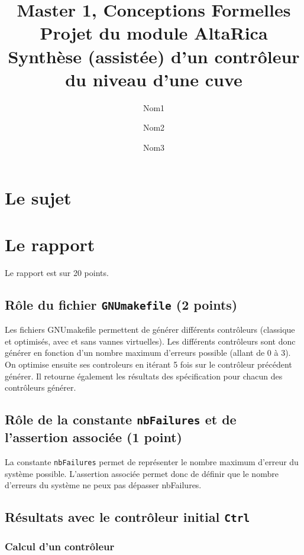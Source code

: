 \documentclass[a4paper]{book}
\newcommand{\altarica}{{\sc AltaRica}}
\begin{document}
\title{Master 1, Conceptions Formelles\\
Projet du module \altarica\\
Synthèse (assistée) d'un contrôleur du niveau d'une cuve}

\date{}

\author{Nom1 \and Nom2 \and Nom3}

\maketitle

\chapter{Le sujet}


\chapter{Le rapport}
Le rapport est sur 20 points.

\section{Rôle du fichier {\tt GNUmakefile} (2 points)}
Les fichiers GNUmakefile permettent de générer différents contrôleurs (classique et optimisés, avec et sans vannes virtuelles).
Les différents contrôleurs sont donc générer en fonction d'un nombre maximum d'erreurs possible (allant de 0 à 3).
On optimise ensuite ses controleurs en itérant 5 fois sur le contrôleur précédent générer.
Il retourne également les résultats des spécification pour chacun des contrôleurs générer.

\section{Rôle de la constante {\tt nbFailures} et de l'assertion associée (1 point)}
La constante {\tt nbFailures} permet de représenter le nombre maximum d'erreur du système possible.
L'assertion associée permet donc de définir que le nombre d'erreurs du système ne peux pas dépasser nbFailures. 

\section{Résultats avec le contrôleur initial {\tt Ctrl}}
\subsection{Calcul d'un contrôleur}
\end{document}
